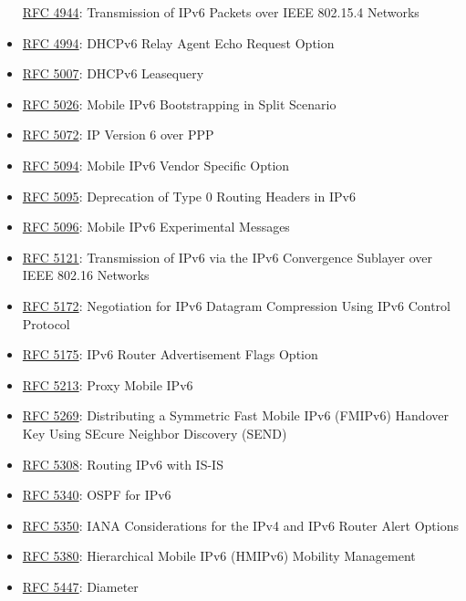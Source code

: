 \documentclass[
]{article}
\begin{document}
\begin{itemize}
  \href{https://www.rfc-editor.org/info/rfc4944}{RFC 4944}: Transmission
  of IPv6 Packets over IEEE 802.15.4 Networks
\item
  \href{https://www.rfc-editor.org/info/rfc4994}{RFC 4994}: DHCPv6 Relay
  Agent Echo Request Option
\item
  \href{https://www.rfc-editor.org/info/rfc5007}{RFC 5007}: DHCPv6
  Leasequery
\item
  \href{https://www.rfc-editor.org/info/rfc5026}{RFC 5026}: Mobile IPv6
  Bootstrapping in Split Scenario
\item
  \href{https://www.rfc-editor.org/info/rfc5072}{RFC 5072}: IP Version 6
  over PPP
\item
  \href{https://www.rfc-editor.org/info/rfc5094}{RFC 5094}: Mobile IPv6
  Vendor Specific Option
\item
  \href{https://www.rfc-editor.org/info/rfc5095}{RFC 5095}: Deprecation
  of Type 0 Routing Headers in IPv6
\item
  \href{https://www.rfc-editor.org/info/rfc5096}{RFC 5096}: Mobile IPv6
  Experimental Messages
\item
  \href{https://www.rfc-editor.org/info/rfc5121}{RFC 5121}: Transmission
  of IPv6 via the IPv6 Convergence Sublayer over IEEE 802.16 Networks
\item
  \href{https://www.rfc-editor.org/info/rfc5172}{RFC 5172}: Negotiation
  for IPv6 Datagram Compression Using IPv6 Control Protocol
\item
  \href{https://www.rfc-editor.org/info/rfc5175}{RFC 5175}: IPv6 Router
  Advertisement Flags Option
\item
  \href{https://www.rfc-editor.org/info/rfc5213}{RFC 5213}: Proxy Mobile
  IPv6
\item
  \href{https://www.rfc-editor.org/info/rfc5269}{RFC 5269}: Distributing
  a Symmetric Fast Mobile IPv6 (FMIPv6) Handover Key Using SEcure
  Neighbor Discovery (SEND)
\item
  \href{https://www.rfc-editor.org/info/rfc5308}{RFC 5308}: Routing IPv6
  with IS-IS
\item
  \href{https://www.rfc-editor.org/info/rfc5340}{RFC 5340}: OSPF for
  IPv6
\item
  \href{https://www.rfc-editor.org/info/rfc5350}{RFC 5350}: IANA
  Considerations for the IPv4 and IPv6 Router Alert Options
\item
  \href{https://www.rfc-editor.org/info/rfc5380}{RFC 5380}: Hierarchical
  Mobile IPv6 (HMIPv6) Mobility Management
\item
  \href{https://www.rfc-editor.org/info/rfc5447}{RFC 5447}: Diameter

\end{itemize}
\end{document}
